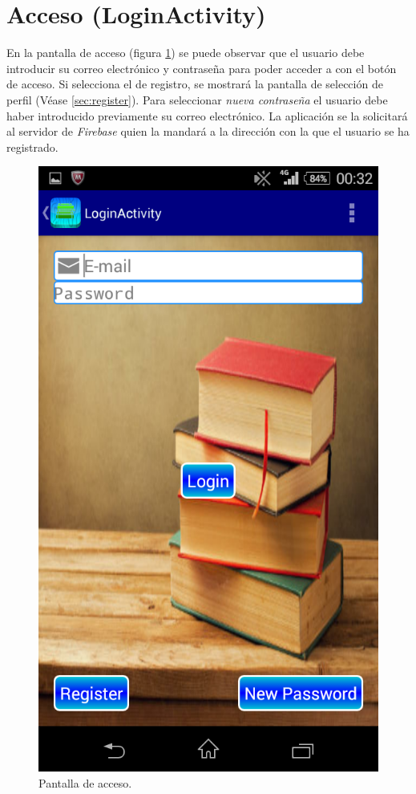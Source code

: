 	\section{Acceso (LoginActivity)} \label{sec:login}
		
		En la pantalla de acceso (figura \ref{fig:login}) se puede observar que el usuario debe introducir su correo electrónico y contraseña para poder acceder a \CollegeApp con el botón de acceso. Si selecciona el de registro, se mostrará la pantalla de selección de perfil (Véase \ref{sec:register}). Para seleccionar {\it nueva contraseña} el usuario debe haber introducido previamente su correo electrónico. La aplicación se la solicitará al servidor de {\it Firebase} quien la mandará a la dirección con la que el usuario se ha registrado.  
		
		\begin{figure}[h !]
			\centering
			\includegraphics[scale=0.2]{Imagenes/App/login}
			\caption{Pantalla de acceso.}
			\label{fig:login}
		\end{figure}
		
